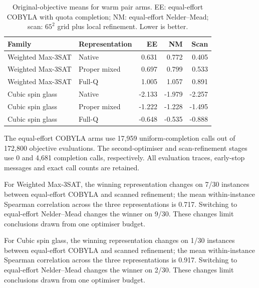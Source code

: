 \documentclass[a4paper,onecolumn,11pt,unpublished]{quantumarticle}
\theoremstyle{remark}
\begin{document}
\begin{table}[t]\centering\small\caption{Original-objective means for warm pair arms. EE: equal-effort COBYLA with quota completion; NM: equal-effort Nelder--Mead; scan: $65^2$ grid plus local refinement. Lower is better.}\label{tab:fresh-optimizer}

\begin{tabular}{llrrr}\toprule Family & Representation & EE & NM & Scan\\\midrule

Weighted Max-3SAT & Native & 0.631 & 0.772 & 0.405 \\

Weighted Max-3SAT & Proper mixed & 0.697 & 0.799 & 0.533 \\

Weighted Max-3SAT & Full-Q & 1.005 & 1.057 & 0.891 \\

Cubic spin glass & Native & -2.133 & -1.979 & -2.257 \\

Cubic spin glass & Proper mixed & -1.222 & -1.228 & -1.495 \\

Cubic spin glass & Full-Q & -0.648 & -0.535 & -0.888 \\

\bottomrule\end{tabular}\end{table}

The equal-effort COBYLA arms use 17,959 uniform-completion calls out of 172,800 objective evaluations. The second-optimiser and scan-refinement stages use 0 and 4,681 completion calls, respectively. All evaluation traces, early-stop messages and exact call counts are retained.

For Weighted Max-3SAT, the winning representation changes on 7/30 instances between equal-effort COBYLA and scanned refinement; the mean within-instance Spearman correlation across the three representations is 0.717. Switching to equal-effort Nelder--Mead changes the winner on 9/30. These changes limit conclusions drawn from one optimiser budget.

For Cubic spin glass, the winning representation changes on 1/30 instances between equal-effort COBYLA and scanned refinement; the mean within-instance Spearman correlation across the three representations is 0.917. Switching to equal-effort Nelder--Mead changes the winner on 2/30. These changes limit conclusions drawn from one optimiser budget.
\end{document}
